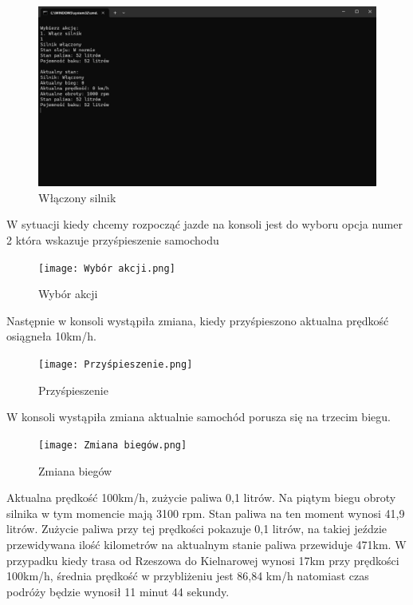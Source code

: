 \begin{figure}[!ht]
	\centering
		\includegraphics[width=17cm]{Włączony silnik.png}
	\caption{\footnotesize Włączony silnik}
	\label{fig:plotend}
\end{figure}
 
W sytuacji kiedy chcemy rozpocząć jazde na konsoli jest do wyboru opcja numer 2 która wskazuje przyśpieszenie samochodu 

\begin{figure}[!ht]
	\centering
		\texttt{[image: Wybór akcji.png]}
	\caption{\footnotesize Wybór akcji}
	\label{fig:plotend}
\end{figure}

\newpage
Następnie w konsoli wystąpiła zmiana, kiedy przyśpieszono aktualna prędkość osiągneła 10km/h.  

\begin{figure}[!ht]
	\centering
		\texttt{[image: Przyśpieszenie.png]}
	\caption{\footnotesize Przyśpieszenie}
	\label{fig:plotend}
\end{figure}
W konsoli wystąpiła zmiana aktualnie samochód porusza się na trzecim biegu. 
\begin{figure}[!ht]
	\centering
		\texttt{[image: Zmiana biegów.png]}
	\caption{\footnotesize Zmiana biegów}
	\label{fig:plotend}
\end{figure}
\newpage
Aktualna prędkość 100km/h, zużycie paliwa 0,1 litrów. Na piątym biegu obroty silnika w tym momencie mają 3100 rpm. Stan paliwa na ten moment wynosi 41,9 litrów. Zużycie paliwa przy tej prędkości pokazuje 0,1 litrów, na takiej jeździe przewidywana ilość kilometrów na aktualnym stanie paliwa przewiduje 471km.
W przypadku kiedy trasa od Rzeszowa do Kielnarowej wynosi 17km przy prędkości 100km/h, średnia prędkość w przybliżeniu jest 86,84 km/h natomiast czas podróży będzie wynosił 11 minut 44 sekundy.

